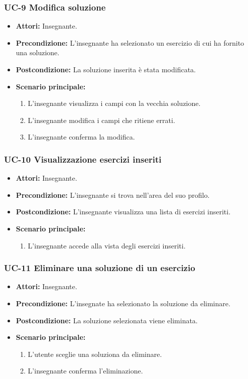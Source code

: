 \subsubsection{UC-9 Modifica soluzione}
\begin{itemize}
\item \textbf{Attori:} Insegnante.
\item \textbf{Precondizione:} L'insegnante ha selezionato un esercizio di cui ha fornito una soluzione.
\item \textbf{Postcondizione:} La soluzione inserita è stata modificata.
\item \textbf{Scenario principale:}
		\begin{enumerate}
		\item L'insegnante visualizza i campi con la vecchia soluzione.
		\item L'insegnante modifica i campi che ritiene errati.
		\item L'insegnante conferma la modifica.
		\end{enumerate}
\end{itemize}

\subsubsection{UC-10 Visualizzazione esercizi inseriti}
\begin{itemize}
\item \textbf{Attori: }Insegnante.
		\item \textbf{Precondizione: }L'insegnante si trova nell'area del suo profilo.
		\item \textbf{Postcondizione: }L'insegnante visualizza una lista di esercizi inseriti. 
		\item \textbf{Scenario principale: }
		\begin{enumerate}
		\item L'insegnante accede alla vista degli esercizi inseriti.
		\end{enumerate}
	\end{itemize}
	
\subsubsection{UC-11 Eliminare una soluzione di un esercizio}
\begin{itemize}
\item \textbf{Attori: }Insegnante.
		\item \textbf{Precondizione: }L'insegnate ha selezionato la soluzione da eliminare.
		\item \textbf{Postcondizione: }La soluzione selezionata viene eliminata. 
		\item \textbf{Scenario principale: }
		\begin{enumerate}
		\item L'utente sceglie una soluziona da eliminare.
		\item L'insegnante conferma l'eliminazione.
		\end{enumerate}
\end{itemize}

